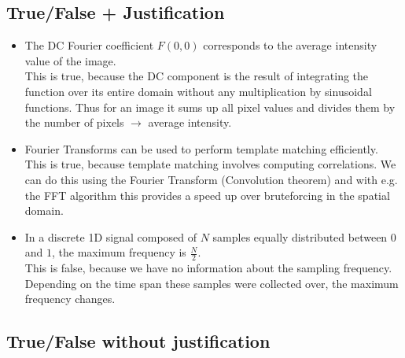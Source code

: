 \documentclass[a4paper,10pt]{article}
\newcommand{\cmark}{\text{\ding{51}}}
\newcommand{\xmark}{\text{\ding{55}}}
\begin{document}
\subsection{True/False + Justification} 
\begin{itemize}
    \item[\cmark] The DC Fourier coefficient \( F(0,0) \) corresponds to the average intensity value of the image.\\
    This is true, because the DC component is the result of integrating the function over its entire domain without any multiplication by sinusoidal functions. Thus for an image it sums up all pixel values and divides them by the number of pixels \( \to  \) average intensity.
    \item[\cmark] Fourier Transforms can be used to perform template matching efficiently.\\
    This is true, because template matching involves computing correlations. We can do this using the Fourier Transform (Convolution theorem) and with e.g. the FFT algorithm this provides a speed up over bruteforcing in the spatial domain.
    \item[\xmark] In a discrete 1D signal composed of \( N \) samples equally distributed between \( 0 \) and \( 1 \), the maximum frequency is \( \frac{N}{2} \).\\
    This is false, because we have no information about the sampling frequency. Depending on the time span these samples were collected over, the maximum frequency changes.
\end{itemize}

\subsection{True/False without justification}
\end{document}
